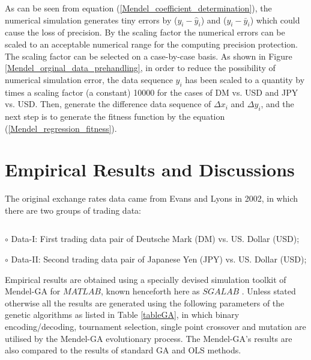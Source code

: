 As can be seen from equation (\ref{Mendel_coefficient_determination}), the numerical simulation generates tiny errors by ($y_i - \hat{y}_i$) and ($y_i - \bar{y}_i$) which could cause the loss of precision. By the scaling factor the numerical errors can be scaled to an acceptable numerical range for the computing precision protection. The scaling factor can be selected on a case-by-case basis. As shown in Figure \ref{Mendel_orginal_data_prehandling}, in order
to reduce the possibility of numerical simulation error, the data
sequence $y_i$ has been scaled to a quantity by times a scaling factor (a constant) 10000 for the cases of DM vs. USD and JPY vs. USD. Then, generate the difference data sequence of $\Delta x_i$
and $\Delta y_i$, and the next step is to generate the fitness
function by the equation (\ref{Mendel_regression_fitness}).



\section{Empirical Results and Discussions }
\label{Simulation}

The original exchange rates data came from Evans and Lyons
\cite{Evans2002} in 2002, in which there are two groups of trading
data:
\begin{list}{$$}
%
\item $\circ$ Data-I: First trading data pair of Deutsche Mark (DM) vs. US. Dollar
(USD); %
%
\item $\circ$ Data-II: Second trading data pair of Japanese Yen (JPY) vs. US. Dollar (USD);
\end{list}

Empirical results are obtained using a specially devised simulation
toolkit of Mendel-GA for $MATLAB$, known henceforth here as $SGALAB$
\cite{sgalab2009}. Unless stated otherwise all the results are
generated using the following parameters of the genetic algorithms
as listed in Table \ref{tableGA}, in which binary encoding/decoding,
tournament selection, single point crossover and mutation are
utilised by the Mendel-GA evolutionary process. The Mendel-GA's
results are also compared to the results of standard GA and OLS
methods.

